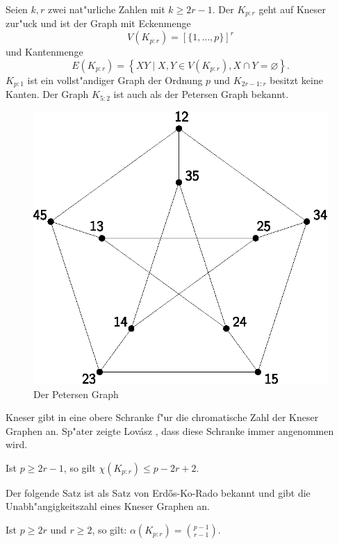   Seien $k,r$ zwei nat"urliche Zahlen mit $k\geq 2r-1$. Der  $K_{p:r}$ geht auf Kneser \cite{Kneser55} zur"uck und ist der Graph mit Eckenmenge $$V(K_{p:r}) = [\{1,\dots,p\}]^{r}$$ und Kantenmenge 
  $$E(K_{p:r}) = \left\{ XY\;|\; X,Y \in V(K_{p:r}), X \cap Y = \varnothing \right\}.$$ 
  $K_{p:1}$ ist ein vollst"andiger Graph der Ordnung $p$ und $K_{2r-1:r}$ besitzt keine Kanten. 
  Der Graph $K_{5:2}$ ist auch als der Petersen Graph bekannt.

  \begin{figure}[h]
    \centering
    \includegraphics{images/petersen}
    \caption{Der Petersen Graph}
    \label{fig:petersen}
  \end{figure}
  Kneser gibt in \cite{Kneser55} eine obere Schranke f"ur die chromatische Zahl der Kneser Graphen an. Sp"ater zeigte Lov\'asz , dass diese Schranke immer angenommen wird.
  \begin{theorem}
    Ist $p\geq 2r-1$, so gilt
    $\chi(K_{p:r}) \leq p-2r+2$. \label{thm:kneserfarbung}
  \end{theorem}
  Der folgende Satz ist als Satz von Erd\H{o}s-Ko-Rado \cite{ErdosKoRado61} bekannt und gibt die Unabh"angigkeitszahl eines Kneser Graphen an.
  \begin{theorem}
    Ist $p\geq 2r$ und $r \geq 2$, so gilt: 
    $\alpha(K_{p:r})= \binom{p-1}{r-1}$.
    \label{thm:ErdosKoRado}
  \end{theorem}
